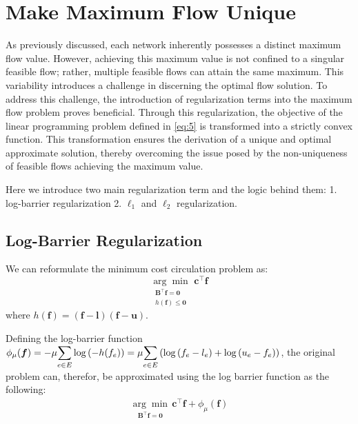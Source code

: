 \documentclass{article} %
\theoremstyle{bfnote}
\begin{document}
\section{Make Maximum Flow Unique}
As previously discussed, each network inherently possesses a distinct maximum flow value. However, achieving this maximum value is not confined to a singular feasible flow; rather, multiple feasible flows can attain the same maximum. This variability introduces a challenge in discerning the optimal flow solution. To address this challenge, the introduction of regularization terms into the maximum flow problem proves beneficial. Through this regularization, the objective of the linear programming problem defined in \cref{eq:5} is transformed into a strictly convex function. This transformation ensures the derivation of a unique and optimal approximate solution, thereby overcoming the issue posed by the non-uniqueness of feasible flows achieving the maximum value.

Here we introduce two main regularization term and the logic behind them: 1. log-barrier regularization 2. $\ell _1$ and $\ell_2$ regularization.

\subsection{Log-Barrier Regularization}
We can reformulate the minimum cost circulation problem as:
\begin{equation}
	\underset{\substack{\bm{B}^{\top} \bm{f}=\bm{0} \\ h(\bm{f}) \leq \bm{0} }}{\arg \min } \hspace{4pt} \bm{c}^{\top} \bm{f}
	\label{eq:8}
\end{equation}
where $h(\bm{f}) = (\bm{f}-\bm{l}) (\bm{f}-\bm{u})$. 

Defining the log-barrier function $\phi_{\mu}(\bm{f})=-\mu \mathlarger{\sum\limits_{e \in E}} \log \left(-h(f_e)\right) = \mu \mathlarger{\sum\limits_{e \in E}} \left( \log \left(f_e-l_e\right) +\log \left(u_e-f_e\right) \right)$, the original problem can, therefor, be approximated using the log barrier function as the following:
\begin{equation}
	\begin{array}{ll}
		\underset{\substack{\bm{B}^{\top} \bm{f}=\bm{0}}}{\arg \min } \hspace{2pt} \bm{c}^{\top} \bm{f} + \phi_{\mu}(\bm{f}) %
	\end{array}
	\label{eq:9}
\end{equation}
\end{document}
